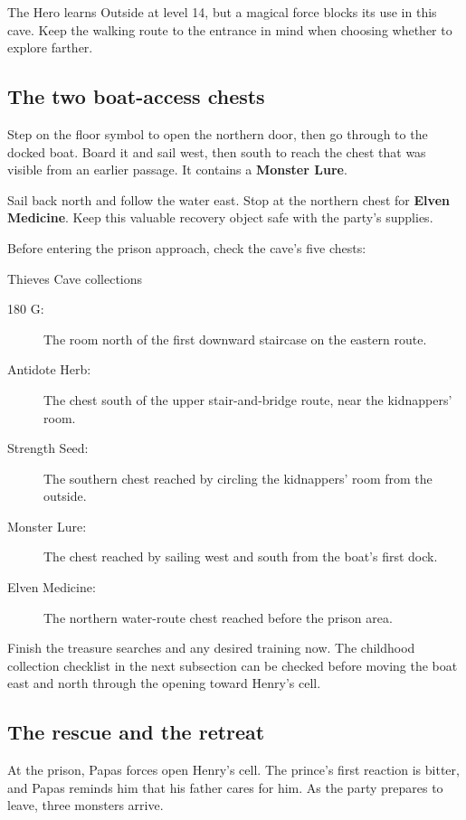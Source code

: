 The Hero learns Outside at level 14, but a magical force blocks its
use in this cave. Keep the walking route to the entrance in mind when
choosing whether to explore farther.

\subsection*{The two boat-access chests}

Step on the floor symbol to open the northern door, then go through
to the docked boat. Board it and sail west, then south to reach the
chest that was visible from an earlier passage. It contains a
\textbf{Monster Lure}.

Sail back north and follow the water east. Stop at the northern chest
for \textbf{Elven Medicine}. Keep this valuable recovery object safe
with the party's supplies.

Before entering the prison approach, check the cave's five chests:
\begin{routecheck}{Thieves Cave collections}
\begin{description}
  \item[180 G:] The room north of the first downward staircase on the
    eastern route.
  \item[Antidote Herb:] The chest south of the upper stair-and-bridge route,
    near the kidnappers' room.
  \item[Strength Seed:] The southern chest reached by circling the
    kidnappers' room from the outside.
  \item[Monster Lure:] The chest reached by sailing west and south from
    the boat's first dock.
  \item[Elven Medicine:] The northern water-route chest reached before
    the prison area.
\end{description}
\end{routecheck}

Finish the treasure searches and any desired training now. The childhood
collection checklist in the next subsection can be checked before moving
the boat east and north through the opening toward Henry's cell.

\subsection*{The rescue and the retreat}

At the prison, Papas forces open Henry's cell. The prince's first reaction
is bitter, and Papas reminds him that his father cares for him. As the
party prepares to leave, three monsters arrive.

